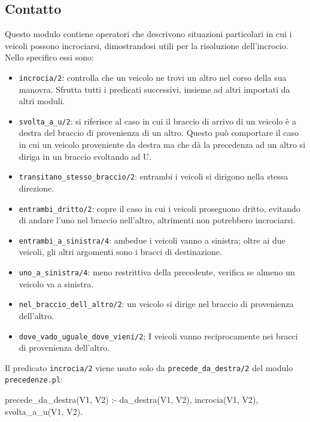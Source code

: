 \subsection{Contatto}
\label{ssec:pos}
Questo modulo contiene operatori che descrivono situazioni particolari in cui i veicoli possono incrociarsi, dimostrandosi utili per la risoluzione dell'incrocio. Nello specifico essi sono:

\begin{itemize}
	\item \texttt{incrocia/2}: controlla che un veicolo ne trovi un altro nel corso della sua manovra. Sfrutta tutti i predicati successivi, insieme ad altri importati da altri moduli.
	
	\item \texttt{svolta\_a\_u/2}: si riferisce al caso in cui il braccio di arrivo di un veicolo è a destra del braccio di provenienza di un altro. Questo può comportare il caso in cui un veicolo proveniente da destra ma che dà la precedenza ad un altro si diriga in un braccio svoltando ad U.
	
	\item \texttt{transitano\_stesso\_braccio/2}: entrambi i veicoli si dirigono nella stessa direzione.
	
	\item \texttt{entrambi\_dritto/2}: copre il caso in cui i veicoli proseguono dritto, evitando di andare l'uno nel braccio nell'altro, altrimenti non potrebbero incrociarsi.
	
	\item \texttt{entrambi\_a\_sinistra/4}: ambedue i veicoli vanno a sinistra; oltre ai due veicoli, gli altri argomenti sono i bracci di destinazione.
	
	\item \texttt{uno\_a\_sinistra/4}: meno restrittiva della precedente, verifica se almeno un veicolo va a sinistra.
	
	\item \texttt{nel\_braccio\_dell\_altro/2}: un veicolo si dirige nel braccio di provenienza dell'altro.
	
	\item \texttt{dove\_vado\_uguale\_dove\_vieni/2}; I veicoli vanno reciprocamente nei bracci di provenienza dell'altro.
\end{itemize}

Il predicato \texttt{incrocia/2} viene usato solo da \texttt{precede\_da\_destra/2} del modulo \texttt{precedenze.pl}:

\begin{verbatimtab}
precede_da_destra(V1, V2) :-
	da_destra(V1, V2),
	incrocia(V1, V2),
	\+ svolta_a_u(V1, V2).
\end{verbatimtab}

